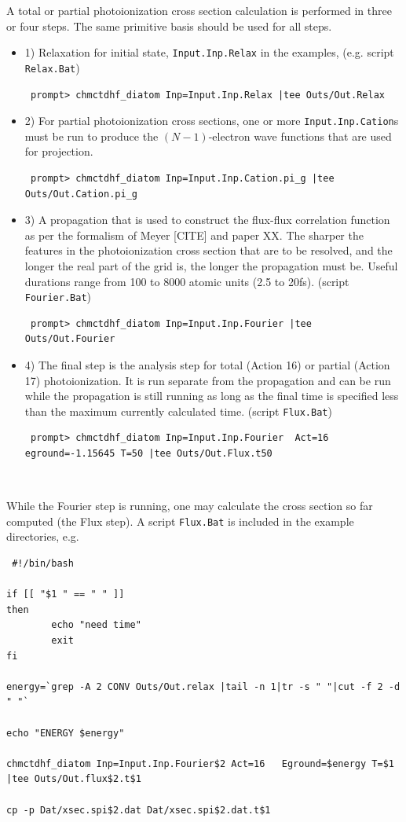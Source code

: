 \documentclass[10pt,leqno, oneside]{book}
\begin{document}
A total or partial photoionization cross section calculation is performed in three or four steps.  
The same primitive basis should be used for all steps.
%
\begin{itemize}
\item{1) Relaxation for initial state, \verb#Input.Inp.Relax# in the examples, (e.g. script \verb#Relax.Bat#)
 {\footnotesize
 \begin{verbatim}
 prompt> chmctdhf_diatom Inp=Input.Inp.Relax |tee Outs/Out.Relax 
 \end{verbatim}
}
}
\item{2) For partial photoionization cross sections, one or more \verb#Input.Inp.Cation#s must be run to produce the $(N-1)$-electron wave functions
that are used for projection.
 {\footnotesize
 \begin{verbatim}
 prompt> chmctdhf_diatom Inp=Input.Inp.Cation.pi_g |tee Outs/Out.Cation.pi_g
 \end{verbatim}
}
}
\item{3) A propagation that is used to construct the flux-flux correlation function as per the formalism of Meyer [CITE] and paper XX.  The sharper the features in the photoionization cross section that are to be resolved, and the longer the real part of the grid is,
the longer the propagation must be.  Useful durations range from 100 to 8000 atomic units (2.5 to 20fs).  (script \verb#Fourier.Bat#)
 {\footnotesize
 \begin{verbatim}
 prompt> chmctdhf_diatom Inp=Input.Inp.Fourier |tee Outs/Out.Fourier
 \end{verbatim}
}
}
\item{4) The final step is the analysis step for total (Action 16) or partial (Action 17) photoionization.  It is run separate from the propagation
and can be run while the propagation is still running as long as the final time is specified less than the maximum currently calculated
time.  (script \verb#Flux.Bat#)
 {\footnotesize
 \begin{verbatim}
 prompt> chmctdhf_diatom Inp=Input.Inp.Fourier  Act=16 eground=-1.15645 T=50 |tee Outs/Out.Flux.t50
 \end{verbatim}
}
}
\end{itemize}

\

While the Fourier step is running, one may calculate the cross section so far computed (the Flux step). 
A script \verb#Flux.Bat# is included in the example directories, e.g.
 {\footnotesize
 \begin{verbatim}
 #!/bin/bash

if [[ "$1 " == " " ]]
then
        echo "need time"
        exit
fi

energy=`grep -A 2 CONV Outs/Out.relax |tail -n 1|tr -s " "|cut -f 2 -d " "`

echo "ENERGY $energy"

chmctdhf_diatom Inp=Input.Inp.Fourier$2 Act=16   Eground=$energy T=$1 |tee Outs/Out.flux$2.t$1

cp -p Dat/xsec.spi$2.dat Dat/xsec.spi$2.dat.t$1
\end{verbatim}
}
\end{document}
